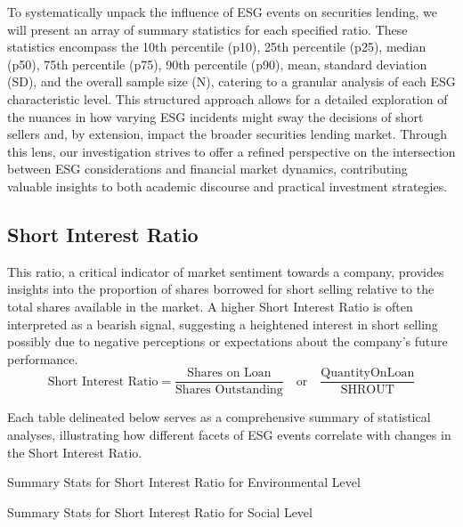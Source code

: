 To systematically unpack the influence of ESG events on securities lending, we will present an array of summary statistics for each specified ratio. These statistics encompass the 10th percentile (p10), 25th percentile (p25), median (p50), 75th percentile (p75), 90th percentile (p90), mean, standard deviation (SD), and the overall sample size (N), catering to a granular analysis of each ESG characteristic level. This structured approach allows for a detailed exploration of the nuances in how varying ESG incidents might sway the decisions of short sellers and, by extension, impact the broader securities lending market. Through this lens, our investigation strives to offer a refined perspective on the intersection between ESG considerations and financial market dynamics, contributing valuable insights to both academic discourse and practical investment strategies.


\subsection{Short Interest Ratio}

This ratio, a critical indicator of market sentiment towards a company, provides insights into the proportion of shares borrowed for short selling relative to the total shares available in the market. A higher Short Interest Ratio is often interpreted as a bearish signal, suggesting a heightened interest in short selling possibly due to negative perceptions or expectations about the company's future performance.
 \begin{equation}
	\text{Short Interest Ratio} = \frac{\text{Shares on Loan}}{\text{Shares Outstanding}} \quad \text{or} \quad \frac{\text{QuantityOnLoan}}{\text{SHROUT}}
	\label{eq:Short_Interest_Ratio}
\end{equation}

Each table delineated below serves as a comprehensive summary of statistical analyses, illustrating how different facets of ESG events correlate with changes in the Short Interest Ratio.

\begin{table}[H]
\caption{Summary Stats for Short Interest Ratio for Environmental Level}
\centering

\label{table:short_interest_ratio_environment.tex}
\end{table}

\begin{table}[H]
\caption{Summary Stats for Short Interest Ratio for Social Level}
\centering

\label{table:short_interest_ratio_social.tex}
\end{table}

